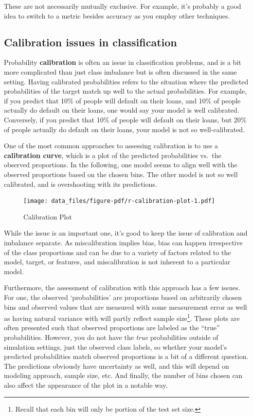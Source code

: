 \documentclass[
  letterpaper,
]{krantz}
\begin{document}
These are not necessarily mutually exclusive. For example, it's probably
a good idea to switch to a metric besides accuracy as you employ other
techniques.

\subsection{Calibration issues in
classification}\label{calibration-issues-in-classification}

Probability \textbf{calibration} is often an issue in classification
problems, and is a bit more complicated than just class imbalance but is
often discussed in the same setting. Having calibrated probabilities
refers to the situation where the predicted probabilities of the target
match up well to the actual probabilities. For example, if you predict
that 10\% of people will default on their loans, and 10\% of people
actually do default on their loans, one would say your model is well
calibrated. Conversely, if you predict that 10\% of people will default
on their loans, but 20\% of people actually do default on their loans,
your model is not so well-calibrated.

One of the most common approaches to assessing calibration is to use a
\textbf{calibration curve}, which is a plot of the predicted
probabilities vs.~the observed proportions. In the following, one model
seems to align well with the observed proportions based on the chosen
bins. The other model is not so well calibrated, and is overshooting
with its predictions.

\begin{figure}[H]

{\centering \texttt{[image: data\_files/figure-pdf/r-calibration-plot-1.pdf]}

}

\caption{Calibration Plot}

\end{figure}%

While the issue is an important one, it's good to keep the issue of
calibration and imbalance separate. As miscalibration implies bias, bias
can happen irrespective of the class proportions and can be due to a
variety of factors related to the model, target, or features, and
miscalibration is not inherent to a particular model.

Furthermore, the assessment of calibration with this approach has a few
issues. For one, the observed `probabilities' are proportions based on
arbitrarily chosen bins and observed values that are measured with some
measurement error as well as having natural variance with will partly
reflect sample size\footnote{Recall that each bin will only be portion
  of the test set size.}. These plots are often presented such that
observed proportions are labeled as the ``true'' probabilities. However,
you do not have the \emph{true} probabilities outside of simulation
settings, just the observed class labels, so whether your model's
predicted probabilities match observed proportions is a bit of a
different question. The predictions obviously have uncertainty as well,
and this will depend on modeling approach, sample size, etc. And
finally, the number of bins chosen can also affect the appearance of the
plot in a notable way.
\end{document}
